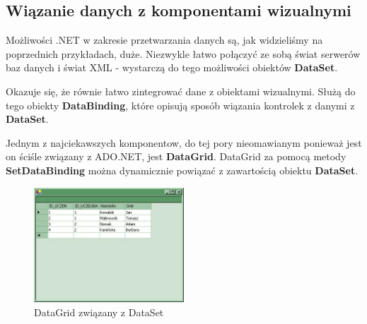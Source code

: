 \subsection{Wiązanie danych z komponentami wizualnymi}
\label{DataGrid}

Możliwości .NET w zakresie przetwarzania danych są, jak widzieliśmy na poprzednich przykładach, duże.
Niezwykle łatwo połączyć ze sobą świat serwerów baz danych i świat XML - wystarczą do tego możliwości
obiektów {\bf DataSet}.

Okazuje się, że równie łatwo zintegrować dane z obiektami wizualnymi. Służą do tego obiekty
{\bf DataBinding}, które opisują sposób wiązania kontrolek z danymi z {\bf DataSet}.

Jednym z najciekawszych komponentow, do tej pory nieomawianym ponieważ jest on ściśle związany
z ADO.NET, jest {\bf DataGrid}. DataGrid za pomocą metody {\bf SetDataBinding} można dynamicznie
powiązać z zawartością obiektu {\bf DataSet}.

\begin{figure}
\begin{center}
\includegraphics[width=0.50\textwidth]{./pic/swf07}
\caption{DataGrid związany z DataSet}
\end{center}
\end{figure}

